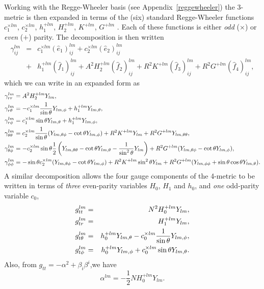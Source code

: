 \documentclass{article}
\begin{document}
Working with the Regge-Wheeler basis (see Appendix~\ref{reggewheeler}) the 3-metric is then
expanded in terms of the (six) standard Regge-Wheeler functions $c_1^{\times lm}$, $c_2^{\times
lm}$, $h_1^{+lm}$, $H_2^{+lm}$, $K^{+lm}$, $G^{+lm}$ \cite{regge,moncrief74}. Each of these
functions is either {\it odd} ($\times$) or {\it even} ($+$) parity. The decomposition is then
written
\begin{eqnarray}
\gamma_{ij}^{lm} & = & c_1^{\times lm}(\hat{e}_1)_{ij}^{lm}
                   +   c_2^{\times lm}(\hat{e}_2)_{ij}^{lm} 
\nonumber\\
                 & + & h_1^{+lm}(\hat{f}_1)_{ij}^{lm} 
                   +   A^2 H_2^{+lm}(\hat{f}_2)_{ij}^{lm}
                   +   R^2 K^{+lm}(\hat{f}_3)_{ij}^{lm}
                   +   R^2 G^{+lm}(\hat{f}_4)_{ij}^{lm},
\end{eqnarray}
which we can write in an expanded form as 
\begin{align}
\gamma_{rr}^{lm} 
  & = A^2 H_2^{+lm} Y_{lm},
\\
\gamma_{r\theta}^{lm} 
  & = - c_1^{\times lm} \frac{1}{\sin\theta} Y_{lm,\phi}+h_1^{+lm}Y_{lm,\theta},
\\
\gamma_{r\phi}^{lm} 
  & = c_1^{\times lm} \sin\theta Y_{lm,\theta}+ h_1^{+lm}Y_{lm,\phi},
\\
\gamma_{\theta\theta}^{lm} 
  & = c_2^{\times lm}\frac{1}{\sin\theta}(Y_{lm,\theta\phi}-\cot\theta Y_{lm,\phi}) 
      + R^2 K^{+lm}Y_{lm} + R^2 G^{+lm}    Y_{lm,\theta\theta},
\\
\gamma_{\theta\phi}^{lm} 
  & = -c_2^{\times lm}\sin\theta \frac{1}{2} 
  \left(
  Y_{lm,\theta\theta}-\cot\theta Y_{lm,\theta}-\frac{1}{\sin^2\theta}Y_{lm} \right)
  + R^2 G^{+lm}(Y_{lm,\theta\phi}-\cot\theta Y_{lm,\phi}),
\\
\gamma_{\phi\phi}^{lm}
  & =  -\sin\theta c_2^{\times lm} (Y_{lm,\theta\phi} - \cot\theta Y_{lm,\phi})
        +R^2 K^{+lm}\sin^2\theta Y_{lm}
        +R^2 G^{+lm} (Y_{lm,\phi\phi}+\sin\theta\cos\theta Y_{lm,\theta}).
\end{align}
A similar decomposition allows the four gauge components of the 4-metric to be written in terms of
{\it three} even-parity variables $H_0$, $H_1$ and $h_0$, and {\it one} odd-parity variable $c_0$,
\begin{eqnarray}
  g_{tt}^{lm} & = & N^2 H_0^{+lm} Y_{lm},
\\
  g_{tr}^{lm} & = & H_1^{+lm} Y_{lm},
\\
  g_{t\theta}^{lm} & = & h_0^{+lm} Y_{lm,\theta} - c_0^{\times lm}\frac{1}{\sin\theta}Y_{lm,\phi},
\\
  g_{t\phi}^{lm} & = & h_0^{+lm} Y_{lm,\phi} + c_0^{\times lm} \sin\theta Y_{lm,\theta}.
\end{eqnarray} 
Also, from $g_{tt}=-\alpha^2+\beta_i\beta^i$,we have
\begin{equation}
  \alpha^{lm} = -\frac{1}{2}NH_0^{+lm}Y_{lm}.
\end{equation}
\end{document}
